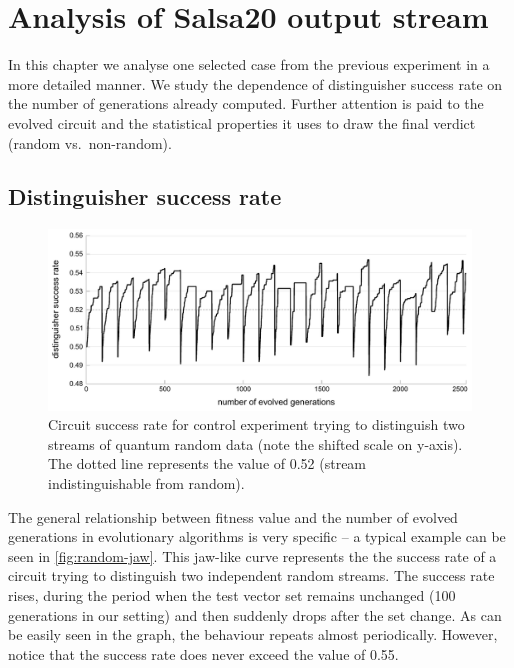 \documentclass[12pt,twoside]{fithesis2}		%
\renewcommand{\_}{\leavevmode \kern0.0em\vbox{\hrule width0.4em}}
\begin{document}
\chapter{Analysis of Salsa20 output stream}
\label{chap:analysis-salsa}

In this chapter we analyse one selected case from the previous experiment in a more detailed manner.
We study the dependence of distinguisher success rate on the number of generations already computed.
Further attention is paid to the evolved circuit and the statistical properties it uses to draw the final verdict
(random vs.\ non-random).

\section{Distinguisher success rate}
\label{sec:salsa-success-rate}

\begin{figure}[b!]
\centering
\includegraphics[width=\textwidth]{images/jaw-random}
\caption{Circuit success rate for control experiment trying to distinguish two streams of quantum random data (note the shifted 
scale on y-axis). The dotted line represents the value of 0.52 (stream indistinguishable from random).}
\label{fig:random-jaw}
\end{figure}

The general relationship between fitness value and the number of evolved generations in evolutionary algorithms is very specific -- 
a typical example can be seen in \autoref{fig:random-jaw}. This jaw-like curve represents the the success rate of a circuit trying
to distinguish two independent random streams. The success rate rises, during the period when the test vector set remains unchanged 
(100 generations in our setting) and then suddenly drops after the set change. As can be easily seen in the graph, 
the behaviour repeats almost periodically. However, notice that the success rate does never exceed the value of 0.55.
\end{document}
